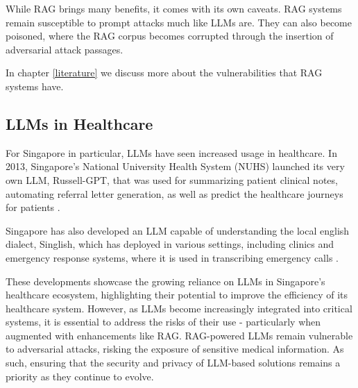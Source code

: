 While RAG brings many benefits, it comes with its own caveats. RAG systems remain susceptible to prompt attacks much like LLMs are. They can also become poisoned, where the RAG corpus becomes corrupted through the insertion of adversarial attack passages.

In chapter \ref{literature} we discuss more about the vulnerabilities that RAG systems have.

\subsection{LLMs in Healthcare}

For Singapore in particular, LLMs have seen increased usage in healthcare. In 2013, Singapore's National University Health System (NUHS) launched its very own LLM, Russell-GPT, that was used for summarizing patient clinical notes, automating referral letter generation, as well as predict the healthcare journeys for patients \autocite{NUHS_2023}.

Singapore has also developed an LLM capable of understanding the local english dialect, Singlish, which has deployed in various settings, including clinics and emergency response systems, where it is used in transcribing emergency calls \autocite{Chia_2024}.

These developments showcase the growing reliance on LLMs in Singapore's healthcare ecosystem, highlighting their potential to improve the efficiency of its healthcare system. However, as LLMs become increasingly integrated into critical systems, it is essential to address the risks of their use - particularly when augmented with enhancements like RAG. RAG-powered LLMs remain vulnerable to adversarial attacks, risking the exposure of sensitive medical information. As such, ensuring that the security and privacy of LLM-based solutions remains a priority as they continue to evolve.
